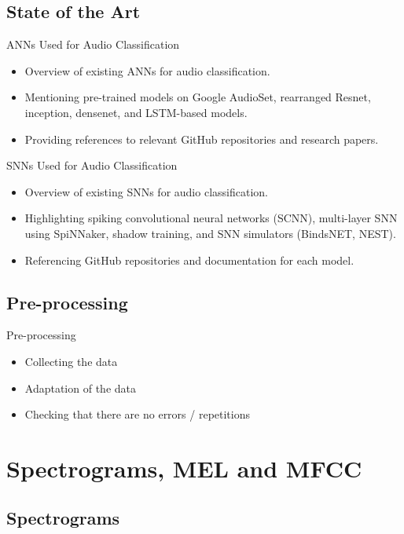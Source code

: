 \documentclass[aspectratio=169, 11pt]{beamer}
\begin{document}
\subsection{State of the Art}

\begin{frame}{ANNs Used for Audio Classification}
  \begin{itemize}
    \item Overview of existing ANNs for audio classification.
    \item Mentioning pre-trained models on Google AudioSet, rearranged Resnet, inception, densenet, and LSTM-based models.
    \item Providing references to relevant GitHub repositories and research papers.
  \end{itemize}
\end{frame}

\begin{frame}{SNNs Used for Audio Classification}
  \begin{itemize}
    \item Overview of existing SNNs for audio classification.
    \item Highlighting spiking convolutional neural networks (SCNN), multi-layer SNN using SpiNNaker, shadow training, and SNN simulators (BindsNET, NEST).
    \item Referencing GitHub repositories and documentation for each model.
  \end{itemize}
\end{frame}

\subsection{Pre-processing}
\begin{frame}{Pre-processing}
  \begin{itemize}
    \item Collecting the data
    \item Adaptation of the data
    \item Checking that there are no errors / repetitions
  \end{itemize}
\end{frame}

\section{Spectrograms, MEL and MFCC}
\subsection{Spectrograms}
\end{document}
